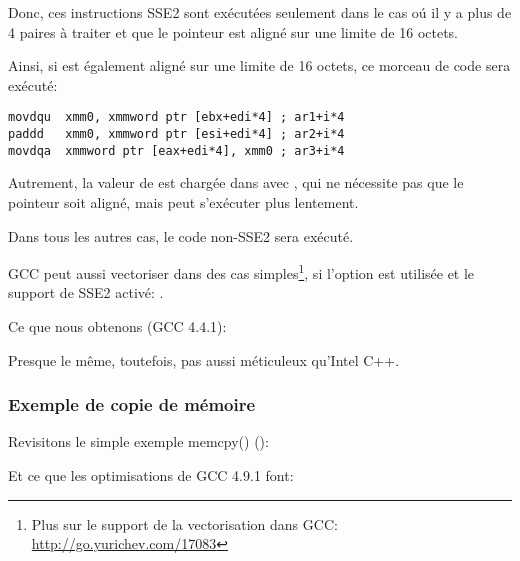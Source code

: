 Donc, ces instructions SSE2 sont exécutées seulement dans le cas oú il y a plus
de 4 paires à traiter et que le pointeur  est aligné sur une limite de 16
octets.

Ainsi, si  est également aligné sur une limite de 16 octets, ce morceau de
code sera exécuté:

\begin{lstlisting}[style=customasmx86]
movdqu  xmm0, xmmword ptr [ebx+edi*4] ; ar1+i*4
paddd   xmm0, xmmword ptr [esi+edi*4] ; ar2+i*4
movdqa  xmmword ptr [eax+edi*4], xmm0 ; ar3+i*4
\end{lstlisting}

Autrement, la valeur de  est chargée dans  avec \MOVDQU, qui ne nécessite
pas que le pointeur soit aligné, mais peut s'exécuter plus lentement.



Dans tous les autres cas, le code non-SSE2 sera exécuté.


\newcommand{\URLGCCVEC}{\url{http://go.yurichev.com/17083}}

GCC peut aussi vectoriser dans des cas simples\footnote{Plus sur le support de la
vectorisation dans GCC: \URLGCCVEC}, si l'option \Othree est utilisée et le support
de SSE2 activé: .

Ce que nous obtenons (GCC 4.4.1):



Presque le même, toutefois, pas aussi méticuleux qu'Intel C++.

\subsubsection{Exemple de copie de mémoire}
\label{vec_memcpy}

Revisitons le simple exemple memcpy()
():



Et ce que les optimisations de GCC 4.9.1 font:


